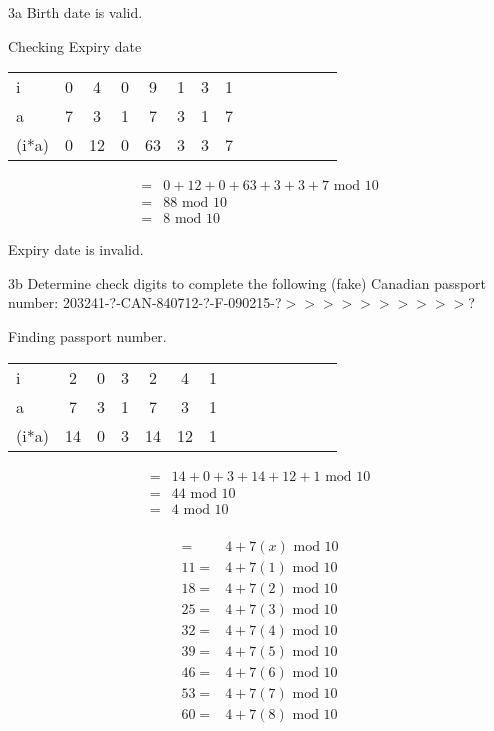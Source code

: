 \begin{question}{3a}
Birth date is valid.



Checking Expiry date

\begin{tabular}{l|ccccccccccccc}
\hline
i     & 0  & 4  & 0  & 9  & 1  & 3  & 1 \\
a     & 7  & 3  & 1  & 7  & 3  & 1  & 7 \\
\hline
(i*a) & 0  & 12 & 0  & 63 & 3  & 3  & 7 
\end{tabular}

\begin{align*}
=& 0  + 12 + 0  + 63 + 3  + 3  + 7  \textrm{ mod } 10\\
=& 88 \textrm{ mod } 10\\
=& 8 \textrm{ mod } 10
\end{align*}

Expiry date is invalid.





\begin{question}{3b}
Determine check digits to complete the following (fake) Canadian passport number:
203241-?-CAN-840712-?-F-090215-?$>>>>>>>>>>$?

Finding passport number.

\begin{tabular}{l|ccccccccccccc}
\hline
i     & 2 & 0 & 3 & 2 & 4 & 1\\
a     & 7 & 3 & 1 & 7 & 3 & 1\\
\hline
(i*a) & 14& 0 & 3 & 14& 12& 1
\end{tabular}

\begin{align*}
=& 14+ 0 + 3 + 14+ 12+ 1 \textrm{ mod } 10\\
=& 44\textrm{ mod } 10\\
=& 4 \textrm{ mod } 10\\
\end{align*}

\begin{align*}
=& 4 + 7(x)\textrm{ mod } 10\\
11 =& 4 + 7(1)\textrm{ mod } 10\\
18 =& 4 + 7(2)\textrm{ mod } 10\\
25 =& 4 + 7(3)\textrm{ mod } 10\\
32 =& 4 + 7(4)\textrm{ mod } 10\\
39 =& 4 + 7(5)\textrm{ mod } 10\\
46 =& 4 + 7(6)\textrm{ mod } 10\\
53 =& 4 + 7(7)\textrm{ mod } 10\\
60 =& 4 + 7(8)\textrm{ mod } 10\\
\end{align*}


\end{question}
\end{question}

